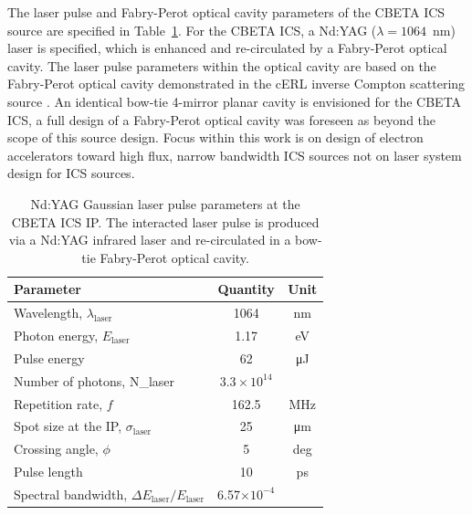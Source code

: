 \documentclass[../main.tex]{subfiles}
\begin{document}
The laser pulse and Fabry-Perot optical cavity parameters of the CBETA ICS source are specified in Table~\ref{tab:CBETA_laser_pulse_design_parameters}. For the CBETA ICS, a Nd:YAG ($\lambda=1064$~\si{\nano\meter}) laser is specified, which is enhanced and re-circulated by a Fabry-Perot optical cavity. The laser pulse parameters within the optical cavity are based on the Fabry-Perot optical cavity demonstrated in the cERL inverse Compton scattering source \cite{akagi2016narrow}. An identical bow-tie 4-mirror planar cavity is envisioned for the CBETA ICS, a full design of a Fabry-Perot optical cavity was foreseen as beyond the scope of this source design. Focus within this work is on design of electron accelerators toward high flux, narrow bandwidth ICS sources not on laser system design for ICS sources.  

\begin{table}[!h]
\centering
\caption{Nd:YAG Gaussian laser pulse parameters at the CBETA ICS IP. The interacted laser pulse is produced via a Nd:YAG infrared laser and re-circulated in a bow-tie Fabry-Perot optical cavity.}
\begin{tabular}{lcc}
\hline\hline
Parameter & Quantity & Unit \\
\hline
Wavelength, $\lambda_\textrm{laser}$ & 1064 & \si{\nano\meter}\\
Photon energy, $E_\textrm{laser}$ & 1.17 & \si{\electronvolt}\\
Pulse energy  & 62 & \si{\micro\joule}\\
Number of photons, N_{\textrm{laser}} & $3.3\times 10^{14}$\\ 
Repetition rate, $f$ & 162.5 & \si{\mega\hertz}\\
Spot size at the IP, $\sigma_\textrm{laser}$ & 25 & \si{\micro\meter}\\
Crossing angle, $\phi$ & 5 & deg \\
Pulse length  & 10 & \si{\pico\second}\\
Spectral bandwidth, $\Delta E_\textrm{laser}/E_\textrm{laser}$ & 6.57$\times 10^{-4}$ &   \\
\hline\hline
\end{tabular}
\label{tab:CBETA_laser_pulse_design_parameters}
\end{table}
\end{document}
